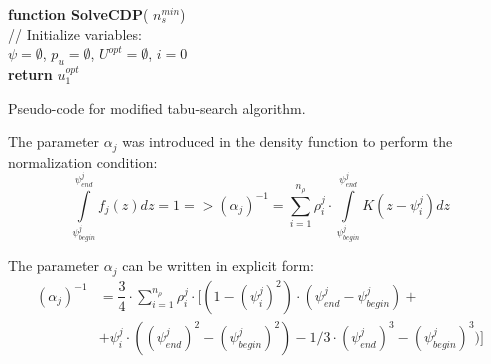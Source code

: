 \documentclass[]{TAACpaper}
\begin{document}
\begin{algorithm}[H]
	\textbf{function SolveCDP}( $n^{min}_s$) \\
	// Initialize variables:	\\
	
	$\psi = \emptyset$,
	$p_u = \emptyset$,
	$U^{opt} = \emptyset$,
	$i=0$ \\
	
	\textbf{return} $u^{opt}_1$
	
	\caption{Pseudo-code for modified tabu-search algorithm.}
	\label{alg:modTabuSearch}
\end{algorithm}

 The parameter $\alpha_j$ was introduced in the density function to perform the normalization condition:
 \begin{equation} \label{norm_cond}
 \int\limits_{\psi^j_{begin}}^{\psi^j_{end}} f_j(z)dz = 1  =>  (\alpha_j)^{-1} = \sum\limits_{i=1}^{n_{\rho}} \rho^j_i \cdot  \int\limits_{\psi^j_{begin}}^{\psi^j_{end}} K(z -  \psi^j_i) dz 
 \end{equation}

 The parameter $\alpha_j$ can be written in explicit form:
  \begin{equation} \label{norm_cond}
 \begin{split}
 (\alpha_j)^{-1} & = \dfrac{3}{4} \cdot \sum\limits_{i=1}^{n_{\rho}} \rho^j_i \cdot [(1 - (\psi^j_i)^2) \cdot (\psi^j_{end} - \psi^j_{begin}) + \\
 & + \psi^j_i \cdot ((\psi^j_{end})^2 - (\psi^j_{begin})^2) - 1/3 \cdot (\psi^j_{end})^3 - (\psi^j_{begin})^3)]
 \end{split}
 \end{equation}
 
\end{document}
